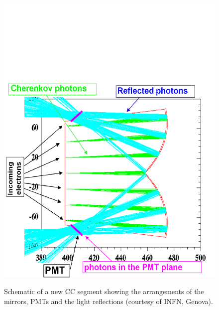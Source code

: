 \begin{figure}[h]
{\includegraphics[scale=0.28]{figuresEG4/FigExp/cerenkovLightReflection}
\label{newCCphRefl}
}
\caption[A new CC segment and light reflections]{Schematic of a new CC segment showing the arrangements of the mirrors, PMTs and the light reflections (courtesy of INFN, Genova).}
\label{figcherenkovNw} %
\end{figure}



